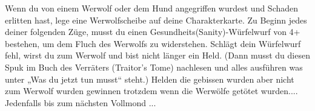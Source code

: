Wenn du von einem Werwolf oder dem Hund angegriffen wurdest und Schaden erlitten hast, lege eine Werwolfscheibe auf deine Charakterkarte. Zu Beginn jedes deiner folgenden Züge, musst du einen Gesundheits(Sanity)-Würfelwurf von 4+ bestehen, um dem Fluch des Werwolfs zu widerstehen. Schlägt dein Würfelwurf fehl, wirst du zum Werwolf und bist nicht länger ein Held. (Dann musst du diesen Spuk im Buch des Verräters (Traitor's Tome) nachlesen und alles ausführen was unter „Was du jetzt tun musst“ steht.)
Helden die gebissen wurden aber nicht zum Werwolf wurden gewinnen trotzdem wenn die Werwölfe getötet wurden.... Jedenfalls bis zum nächsten Vollmond ...



